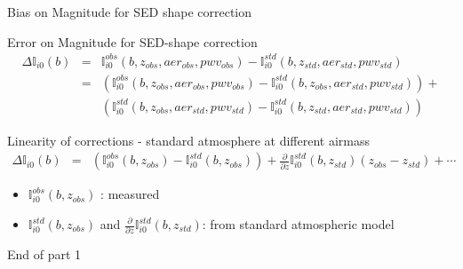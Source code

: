 \documentclass{beamer}
\begin{document}
\begin{frame}{Bias on Magnitude for SED shape correction}
\begin{block}{Error on Magnitude for SED-shape correction}
\begin{eqnarray}
\Delta \mathbb{I}_{i0}(b) & = &  \mathbb{I}_{i0}^{obs}(b,z_{obs},aer_{obs},pwv_{obs}) - \mathbb{I}_{i0}^{std}(b,z_{std},aer_{std},pwv_{std}) \nonumber \\
& = & \left(\mathbb{I}_{i0}^{obs}(b,z_{obs},aer_{obs},pwv_{obs}) - \mathbb{I}_{i0}^{std}(b,z_{obs},aer_{std},pwv_{std})\right) +  \nonumber \\
& & \left(\mathbb{I}_{i0}^{std}(b,z_{obs},aer_{std},pwv_{std}) - \mathbb{I}_{i0}^{std}(b,z_{std},aer_{std},pwv_{std})\right)  \nonumber 
\end{eqnarray}
\end{block}

\begin{alertblock}{Linearity of corrections - standard atmosphere at different airmass}
\begin{eqnarray}
\Delta \mathbb{I}_{i0}(b) & = & \left(\mathbb{I}_{i0}^{obs}(b,z_{obs}) - \mathbb{I}_{i0}^{std}(b,z_{obs})\right) + \frac{\partial}{\partial z}\mathbb{I}_{i0}^{std}(b,z_{std})(z_{obs}-z_{std}) + \cdots \nonumber
\end{eqnarray}
\end{alertblock}
\begin{itemize}
\item $\mathbb{I}_{i0}^{obs}(b,z_{obs})$ : measured
\item $\mathbb{I}_{i0}^{std}(b,z_{obs})$ and $\frac{\partial}{\partial z}\mathbb{I}_{i0}^{std}(b,z_{std})$: from standard atmospheric model
\end{itemize}
\end{frame}



\begin{frame}
\begin{center}
{

\LARGE \alert{End of part 1}}

\end{center}

\end{frame}

 
\end{document}
